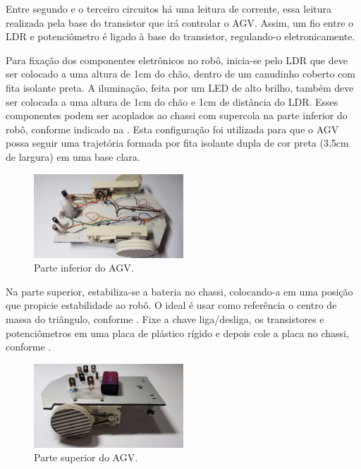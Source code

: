 \documentclass{textolivre}
\begin{document}
Entre segundo e o terceiro circuitos há uma leitura de corrente, essa leitura
realizada pela base do transistor que irá controlar o AGV. Assim, um fio entre
o LDR e potenciômetro é ligado à base do transistor, regulando-o
eletronicamente.

Para fixação dos componentes eletrônicos no robô, inicia-se pelo LDR que deve
ser colocado a uma altura de 1cm do chão, dentro de um canudinho coberto com
fita isolante preta. A iluminação, feita por um LED de alto brilho, também deve
ser colocada a uma altura de 1cm do chão e 1cm de distância do LDR. Esses
componentes podem ser acoplados ao chassi com supercola na parte inferior do
robô, conforme indicado na . Esta configuração foi utilizada para que
o AGV possa seguir uma trajetória formada por fita isolante dupla de cor preta
(3,5cm de largura) em uma base clara.

\begin{figure}[h!]
\centering
\includegraphics[width=0.5\textwidth]{figure-20.pdf}
\caption{Parte inferior do AGV.}
\label{fig14}
\end{figure}

Na parte superior, estabiliza-se a bateria no chassi, colocando-a em uma
posição que propicie estabilidade ao robô. O ideal é usar como referência o
centro de massa do triângulo, conforme . Fixe a chave liga/desliga, os
transistores e potenciômetros em uma placa de plástico rígido e depois cole a
placa no chassi, conforme .

\begin{figure}[H]
\centering
\includegraphics[width=0.5\textwidth]{figure-21.pdf}
\caption{Parte superior do AGV.}
\label{fig15}
\end{figure}
\end{document}
